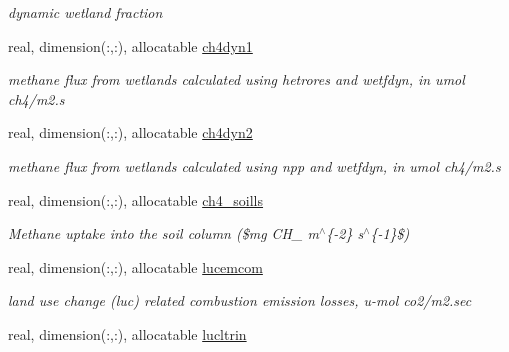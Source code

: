\begin{DoxyCompactItemize}
\begin{DoxyCompactList}\small\item\em dynamic wetland fraction \end{DoxyCompactList}\item 
\hypertarget{structctem__statevars_1_1veg__rot_a46f7b352b6f9ba0d1c05b60d0504814e}{}real, dimension(\+:,\+:), allocatable \hyperlink{structctem__statevars_1_1veg__rot_a46f7b352b6f9ba0d1c05b60d0504814e}{ch4dyn1}\label{structctem__statevars_1_1veg__rot_a46f7b352b6f9ba0d1c05b60d0504814e}

\begin{DoxyCompactList}\small\item\em methane flux from wetlands calculated using hetrores and wetfdyn, in umol ch4/m2.\+s \end{DoxyCompactList}\item 
\hypertarget{structctem__statevars_1_1veg__rot_ad7566d1d8daf1cac25336cf43a391520}{}real, dimension(\+:,\+:), allocatable \hyperlink{structctem__statevars_1_1veg__rot_ad7566d1d8daf1cac25336cf43a391520}{ch4dyn2}\label{structctem__statevars_1_1veg__rot_ad7566d1d8daf1cac25336cf43a391520}

\begin{DoxyCompactList}\small\item\em methane flux from wetlands calculated using npp and wetfdyn, in umol ch4/m2.\+s \end{DoxyCompactList}\item 
\hypertarget{structctem__statevars_1_1veg__rot_a8de72cb08a3000f51e2b31026d01fcd9}{}real, dimension(\+:,\+:), allocatable \hyperlink{structctem__statevars_1_1veg__rot_a8de72cb08a3000f51e2b31026d01fcd9}{ch4\+\_\+soills}\label{structctem__statevars_1_1veg__rot_a8de72cb08a3000f51e2b31026d01fcd9}

\begin{DoxyCompactList}\small\item\em Methane uptake into the soil column (\$mg C\+H\+\_ m$^\wedge$\{-\/2\} s$^\wedge$\{-\/1\}\$) \end{DoxyCompactList}\item 
\hypertarget{structctem__statevars_1_1veg__rot_aaf7b4033868af21f1fe6f7ce16829798}{}real, dimension(\+:,\+:), allocatable \hyperlink{structctem__statevars_1_1veg__rot_aaf7b4033868af21f1fe6f7ce16829798}{lucemcom}\label{structctem__statevars_1_1veg__rot_aaf7b4033868af21f1fe6f7ce16829798}

\begin{DoxyCompactList}\small\item\em land use change (luc) related combustion emission losses, u-\/mol co2/m2.\+sec \end{DoxyCompactList}\item 
\hypertarget{structctem__statevars_1_1veg__rot_abe065c997626550175c3b098914840b4}{}real, dimension(\+:,\+:), allocatable \hyperlink{structctem__statevars_1_1veg__rot_abe065c997626550175c3b098914840b4}{lucltrin}\label{structctem__statevars_1_1veg__rot_abe065c997626550175c3b098914840b4}


\end{DoxyCompactItemize}
